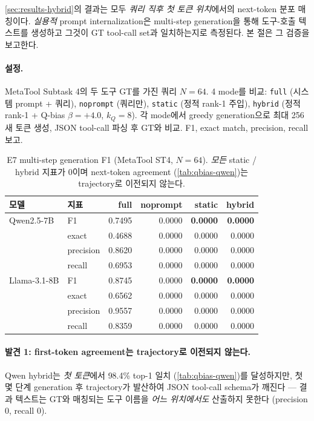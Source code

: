 \documentclass{article}
\theoremstyle{definition}
\begin{document}
\cref{sec:results-hybrid}의 결과는 모두 \emph{쿼리 직후 첫 토큰 위치}에서의 next-token 분포 매칭이다. \emph{실용적} prompt internalization은 multi-step generation을 통해 도구-호출 텍스트를 생성하고 그것이 GT tool-call set과 일치하는지로 측정된다. 본 절은 그 검증을 보고한다.

\paragraph{설정.}
MetaTool Subtask 4의 두 도구 GT를 가진 쿼리 $N=64$. 4 mode를 비교: \texttt{full} (시스템 prompt + 쿼리), \texttt{noprompt} (쿼리만), \texttt{static} (정적 rank-1 주입), \texttt{hybrid} (정적 rank-1 + Q-bias $\beta{=}{+}4.0$, $k_Q{=}8$). 각 mode에서 greedy generation으로 최대 256 새 토큰 생성, JSON tool-call 파싱 후 GT와 비교. F1, exact match, precision, recall 보고.

\begin{table}[h]
\centering
\caption{E7 multi-step generation F1 (MetaTool ST4, $N{=}64$). \emph{모든} static / hybrid 지표가 0이며 next-token agreement (\cref{tab:qbias-qwen})는 trajectory로 이전되지 않는다.}
\label{tab:e7-multistep}
\small
\begin{tabular}{llrrrr}
\toprule
모델 & 지표 & full & noprompt & static & hybrid \\
\midrule
Qwen2.5-7B   & F1            & 0.7495 & 0.0000 & \textbf{0.0000} & \textbf{0.0000} \\
             & exact         & 0.4688 & 0.0000 & 0.0000 & 0.0000 \\
             & precision     & 0.8620 & 0.0000 & 0.0000 & 0.0000 \\
             & recall        & 0.6953 & 0.0000 & 0.0000 & 0.0000 \\
\midrule
Llama-3.1-8B & F1            & 0.8745 & 0.0000 & \textbf{0.0000} & \textbf{0.0000} \\
             & exact         & 0.6562 & 0.0000 & 0.0000 & 0.0000 \\
             & precision     & 0.9557 & 0.0000 & 0.0000 & 0.0000 \\
             & recall        & 0.8359 & 0.0000 & 0.0000 & 0.0000 \\
\bottomrule
\end{tabular}
\end{table}

\paragraph{발견 1: first-token agreement는 trajectory로 이전되지 않는다.}
Qwen hybrid는 \emph{첫 토큰}에서 98.4\% top-1 일치 (\cref{tab:qbias-qwen})를 달성하지만, 첫 몇 단계 generation 후 trajectory가 발산하여 JSON tool-call schema가 깨진다 — 결과 텍스트는 GT와 매칭되는 도구 이름을 \emph{어느 위치에서도} 산출하지 못한다 (precision 0, recall 0).
\end{document}
